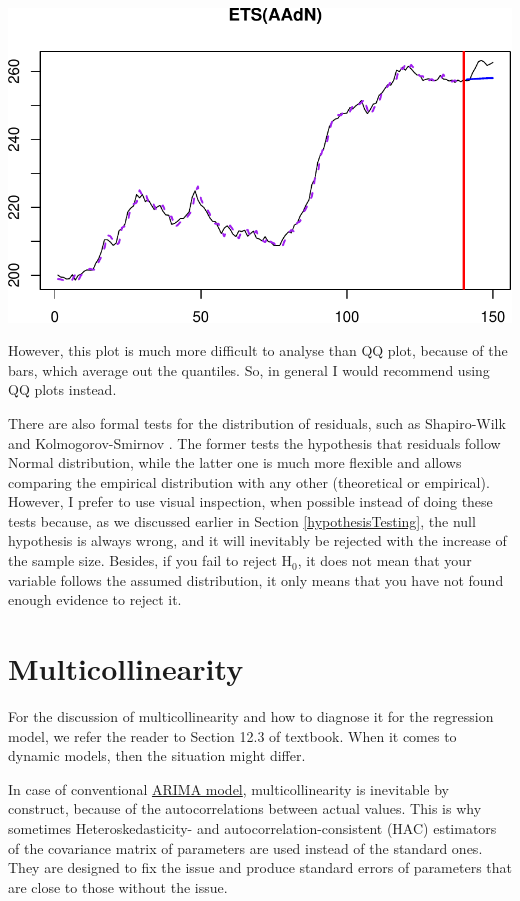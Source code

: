 \documentclass[
]{book}
\theoremstyle{definition}
\theoremstyle{definition}
\theoremstyle{definition}
\theoremstyle{definition}
\theoremstyle{remark}
\begin{document}
\includegraphics{adam_files/figure-latex/unnamed-chunk-165-1.pdf}

However, this plot is much more difficult to analyse than QQ plot, because of the bars, which average out the quantiles. So, in general I would recommend using QQ plots instead.

There are also formal tests for the distribution of residuals, such as Shapiro-Wilk \citep{WikipediaShapiroWilk2021} and Kolmogorov-Smirnov \citep{WikipediaKolmogorovSmirnov2021}. The former tests the hypothesis that residuals follow Normal distribution, while the latter one is much more flexible and allows comparing the empirical distribution with any other (theoretical or empirical). However, I prefer to use visual inspection, when possible instead of doing these tests because, as we discussed earlier in Section \ref{hypothesisTesting}, the null hypothesis is always wrong, and it will inevitably be rejected with the increase of the sample size. Besides, if you fail to reject H\(_0\), it does not mean that your variable follows the assumed distribution, it only means that you have not found enough evidence to reject it.

\hypertarget{diagnosticsMulticollinearity}{%
\section{Multicollinearity}\label{diagnosticsMulticollinearity}}

For the discussion of multicollinearity and how to diagnose it for the regression model, we refer the reader to Section 12.3 of \citet{SvetunkovSBA} textbook. When it comes to dynamic models, then the situation might differ.

In case of conventional \protect\hyperlink{ARIMA}{ARIMA model}, multicollinearity is inevitable by construct, because of the autocorrelations between actual values. This is why sometimes Heteroskedasticity- and autocorrelation-consistent (HAC) estimators of the covariance matrix \citep[see Section 15.4 of][]{Hanck2020} of parameters are used instead of the standard ones. They are designed to fix the issue and produce standard errors of parameters that are close to those without the issue.
\end{document}
